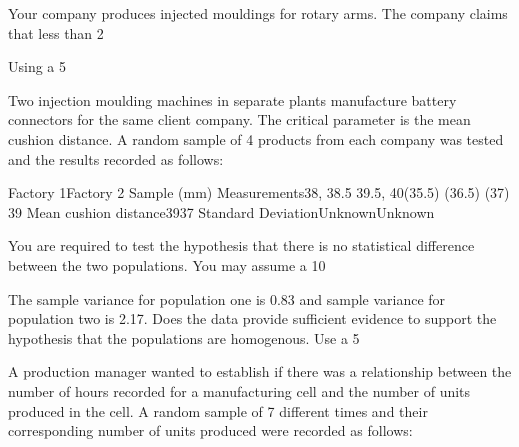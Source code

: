 




\item Your company produces injected mouldings for rotary arms. The company claims that less than 2%

Using a 5%


\item Two injection moulding machines in separate plants manufacture battery
connectors for the same client company.  The critical parameter is the mean cushion distance.  A random sample of 4 products from each company was tested and the results recorded as follows:

Factory 1Factory 2
Sample (mm) Measurements38,     38.5
39.5,  40(35.5)  (36.5)
(37)     39
Mean cushion distance3937
Standard DeviationUnknownUnknown

You are required to test the hypothesis that there is no statistical difference between the two populations.  You may assume a 10%

\item The sample variance for population one is 0.83 and sample variance for population two is 2.17.  Does the data provide sufficient evidence to support the hypothesis that the populations are homogenous.  Use a 5%





\item A production manager wanted to establish if there was a relationship between the number of hours recorded for a manufacturing cell and the number of units produced in the cell.  A random sample of 7 different times and their corresponding number of units produced were recorded as follows:


